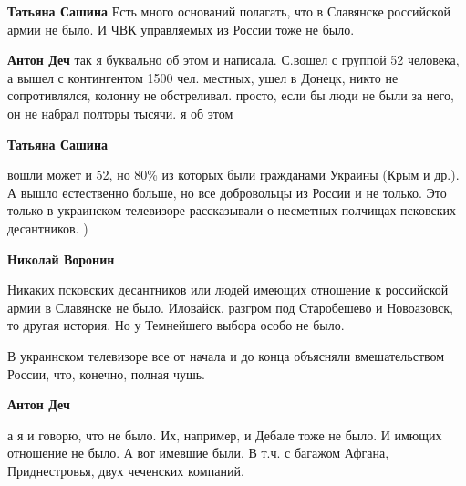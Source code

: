 \begin{itemize}
\begin{itemize}
\textbf{Татьяна Сашина} Есть много оснований полагать, что в Славянске российской армии не было. И ЧВК управляемых из России тоже не было.

 
\textbf{Антон Деч} так я буквально об этом и написала. С.вошел с группой 52 человека, а вышел с контингентом 1500 чел. местных, ушел в Донецк, никто не сопротивлялся, колонну не обстреливал. просто, если бы люди не были за него, он не набрал полторы тысячи. я об этом

 
\textbf{Татьяна Сашина} 

вошли может и 52, но 80\% из которых были гражданами Украины (Крым и др.). А
вышло естественно больше, но все добровольцы из России и не только. Это только
в украинском телевизоре рассказывали о несметных полчищах псковских
десантников. )

 
\textbf{Николай Воронин} 

Никаких псковских десантников или людей имеющих отношение к российской армии в
Славянске не было.  Иловайск, разгром под Старобешево и Новоазовск, то другая
история. Но у Темнейшего выбора особо не было.

В украинском телевизоре все от начала и до конца объясняли вмешательством
России, что, конечно, полная чушь.


 
\textbf{Антон Деч} 

а я и говорю, что не было. Их, например, и Дебале тоже не было. И имющих
отношение не было. А вот имевшие были. В т.ч. с багажом Афгана, Приднестровья,
двух чеченских компаний.


\end{itemize}
\end{itemize}
